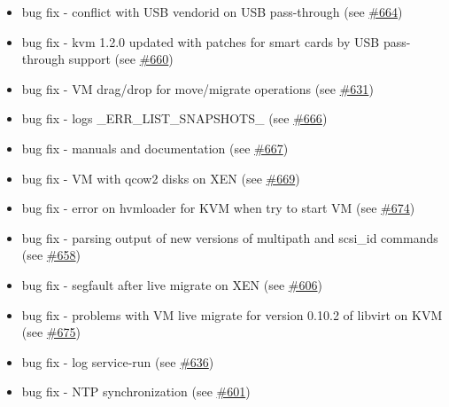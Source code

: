\begin{itemize}
    \item bug fix - conflict with USB vendorid on USB pass-through (see \href{https://srcmaster.eurotux.com/pm/p/etva/ticket/664}{\#664})
    \item bug fix - kvm 1.2.0 updated with patches for smart cards by USB pass-through support (see \href{https://srcmaster.eurotux.com/pm/p/etva/ticket/660}{\#660})
    \item bug fix - VM drag/drop for move/migrate operations (see \href{https://srcmaster.eurotux.com/pm/p/etva/ticket/631}{\#631})
    \item bug fix - logs \_ERR\_LIST\_SNAPSHOTS\_ (see \href{https://srcmaster.eurotux.com/pm/p/etva/ticket/666}{\#666})
    \item bug fix - manuals and documentation (see \href{https://srcmaster.eurotux.com/pm/p/etva/ticket/667}{\#667})
    \item bug fix - VM with qcow2 disks on XEN (see \href{https://srcmaster.eurotux.com/pm/p/etva/ticket/669}{\#669})
    \item bug fix - error on hvmloader for KVM when try to start VM (see \href{https://srcmaster.eurotux.com/pm/p/etva/ticket/674}{\#674})
    \item bug fix - parsing output of new versions of multipath and scsi\_id commands (see \href{https://srcmaster.eurotux.com/pm/p/etva/ticket/658}{\#658})
    \item bug fix - segfault after live migrate on XEN (see \href{https://srcmaster.eurotux.com/pm/p/etva/ticket/606}{\#606})
    \item bug fix - problems with VM live migrate for version 0.10.2 of libvirt on KVM (see \href{https://srcmaster.eurotux.com/pm/p/etva/ticket/675}{\#675})
    \item bug fix - log service-run (see \href{https://srcmaster.eurotux.com/pm/p/etva/ticket/636}{\#636})
    \item bug fix - NTP synchronization (see \href{https://srcmaster.eurotux.com/pm/p/etva/ticket/601}{\#601})
\end{itemize}
